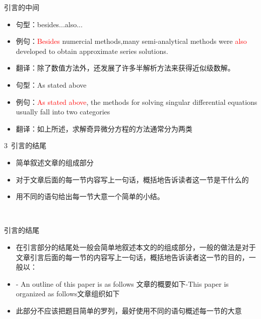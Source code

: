 \documentclass[13pt]{ctexbeamer}
\newcommand{\red}[1]{\textcolor{red}{#1}}
\begin{document}
\begin{frame}{引言的中间}

\begin{itemize}
    \item 句型：besides...also...
    \item 例句：\red{Besides} numercial methods,many semi-analytical methods were \red{also} developed to obtain approximate series solutions.
    \item 翻译：除了数值方法外，还发展了许多半解析方法来获得近似级数解。
    \newline
    \item 句型：As stated above
    \item 例句：\red{As stated above}, the methods for solving singular differential equations usually fall into two categories
    \item 翻译：如上所述，求解奇异微分方程的方法通常分为两类

\end{itemize}
\end{frame}



\begin{frame}{3~引言的结尾}
    \begin{itemize}

        \item 简单叙述文章的组成部分

        \item 对于文章后面的每一节内容写上一句话，概括地告诉读者这一节是干什么的
        \item 用不同的语句给出每一节大意一个简单的小结。
    \end{itemize}
\end{frame}
\\


\begin{frame}{引言的结尾}

\begin{itemize}
    \item
    在引言部分的结尾处一般会简单地叙述本文的的组成部分，一般的做法是对于文章引言后面的每一节的内容写上一句话，概括地告诉读者这一节的目的，一般以：
    \item
    - An outline of this paper is as follows \newline 文章的概要如下\newline-This paper is organized as follows\newline 文章组织如下
    \item
    此部分不应该把题目简单的罗列，最好使用不同的语句概述每一节的大意
\end{itemize}
\end{frame}
\end{document}
